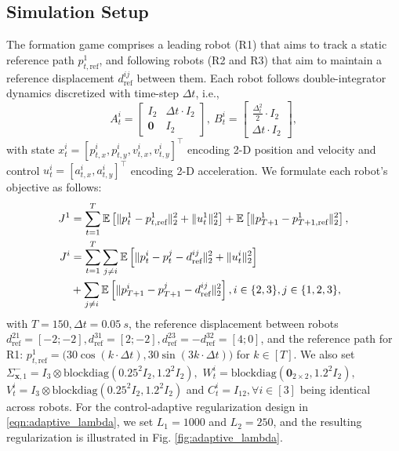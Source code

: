 \documentclass[letterpaper, 10 pt, conference]{ieeeconf}  %
\begin{document}
\subsection{Simulation Setup}
The formation game comprises a leading robot (R1) that aims to track a static reference path $p_{t,\text{ref}}^1$, and following robots (R2 and R3) that aim to maintain a reference displacement $d_{\text{ref}}^{ij}$ between them. Each robot follows double-integrator dynamics discretized with time-step $\Delta t$, i.e.,
\begin{equation*}
    A_t^i=\begin{bmatrix}
        I_2 & \Delta t\cdot I_2 \\ \textbf{0} & I_2
    \end{bmatrix},\  
    B_t^i=\begin{bmatrix}
        \frac{\Delta_t^2}{2}\cdot I_2 \\ \Delta t\cdot I_2
    \end{bmatrix},
\end{equation*}
with state $x_t^i=[p_{t,x}^i,p_{t,y}^i,v_{t,x}^i,v_{t,y}^i]^\top$ encoding 2-D position and velocity and control $u_t^i=[a_{t,x}^i,a_{t,y}^i]^\top$ encoding 2-D acceleration. We formulate each robot's objective as follows:
\begin{equation}
    \begin{aligned}
        J^1&=\sum_{t=1}^T\mathbb{E}\left[\|p_t^1-p_{t,\text{ref}}^1\|_2^2+\|u_t^1\|_2^2\right]\notag+\mathbb{E}\left[\|p_{T+1}^1-p_{T+1,\text{ref}}^1\|_2^2\right],\\
        J^i&=\sum_{t=1}^T\sum_{j\neq i}\mathbb{E}\left[\|p_t^i-p_t^j-d_{\text{ref}}^{ij}\|_2^2+\|u_t^i\|_2^2\right]\notag\\
        &+\sum_{j\neq i}\mathbb{E}\left[\|p_{T+1}^i-p_{T+1}^j-d_{\text{ref}}^{ij}\|_2^2\right], i\in\{2,3\}, j\in\{1,2,3\},
    \end{aligned}
\end{equation}
with $T=150, \Delta t=\SI{0.05}{s}$, the reference displacement between robots $d_{\text{ref}}^{21}=[-2;-2], d_{\text{ref}}^{31}=[2;-2], d_{\text{ref}}^{23}=-d_{\text{ref}}^{32}=[4;0]$, and the reference path for R1: $p_{t,\text{ref}}^1=\big(30\cos{(k\cdot\Delta t)}, 30\sin{(3k\cdot\Delta t)}\big)$ for $k\in[T]$. We also set  $
        \Sigma_{\textbf{x},1}^-=I_3\otimes\text{blockdiag}(0.25^2I_2, 1.2^2I_2),$ $
        W_t^i=\text{blockdiag}(\textbf{0}_{2\times 2}, 1.2^2I_2),$ $
        V_t^i=I_3\otimes\text{blockdiag}(0.25^2I_2, 1.2^2I_2)$
and $C_t^i=I_{12}, \forall i\in[3]$ being identical across robots. For the control-adaptive regularization design in \eqref{eqn:adaptive_lambda}, we set $L_1=1000$ and $L_2=250$, and the resulting regularization is illustrated in Fig. \ref{fig:adaptive_lambda}.
\end{document}
